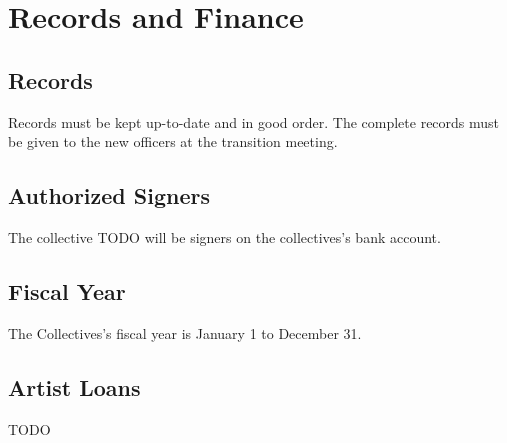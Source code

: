 \chapter{Records and Finance}

\section{Records}\label{sec:records}
Records must be kept up-to-date and in good order. The complete records must be given to the new officers at the transition meeting.

\section{Authorized Signers}\label{sec:authorized_signers}
The collective TODO will be signers on the collectives's bank account.

\section{Fiscal Year}\label{sec:fiscal_year}
The Collectives's fiscal year is January 1 to December 31.

\section{Artist Loans}\label{sec:artist_loans}
TODO
